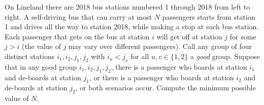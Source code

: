 On Lineland there are 2018 bus stations numbered 1 through 2018 from left to right. A self-driving bus that can carry at most $N$ passengers starts from station 1 and drives all the way to station 2018, while making a stop at each bus station. Each passenger that gets on the bus at station $i$ will get off at station $j$ for some $j>i$ (the value of $j$ may vary over different passengers). Call any group of four distinct stations $i_1, i_2, j_1, j_2$ with $i_u< j_v$ for all $u,v\in \{1,2\}$ a \emph{good} group. Suppose that in any good group $i_1, i_2, j_1, j_2$, there is a passenger who boards at station $i_1$ and de-boards at station $j_1$, or there is a passenger who boards at station $i_2$ and de-boards at station $j_2$, or both scenarios occur. Compute the minimum possible value of $N$.
